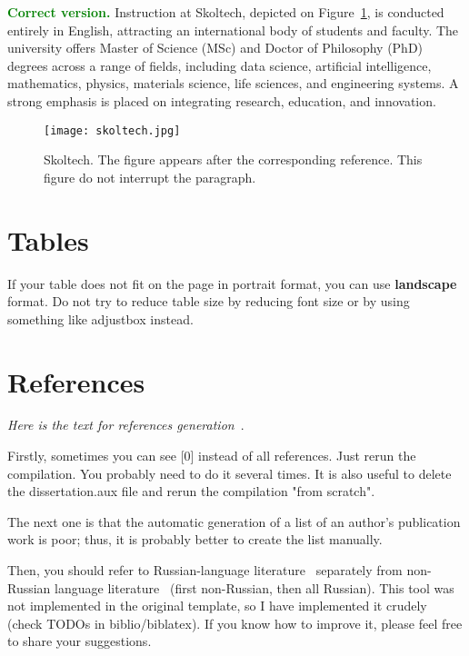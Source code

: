 \textcolor{green}{\textbf{Correct version.}}
Instruction at Skoltech, depicted on Figure~\ref{fig:example}, is conducted entirely in English, attracting an international body of students and faculty. The university offers Master of Science (MSc) and Doctor of Philosophy (PhD) degrees across a range of fields, including data science, artificial intelligence, mathematics, physics, materials science, life sciences, and engineering systems. A strong emphasis is placed on integrating research, education, and innovation. 

\begin{figure}[!h]
	\centering
	\texttt{[image: skoltech.jpg]}
	\caption{Skoltech. The figure appears after the corresponding reference. This figure do not interrupt the paragraph.}
	\label{fig:example}
\end{figure}

\section{Tables}

If your table does not fit on the page in portrait format, you can use \textbf{landscape} format. Do not try to reduce table size by reducing font size or by using something like adjustbox instead. 

\section{References}
\textit{Here is the text for references generation~\cite{lorden1971procedures, zhang2024self, ширяев1965некоторые}}.

Firstly, sometimes you can see [0] instead of all references. Just rerun the compilation. You probably need to do it several times. It is also useful to delete the dissertation.aux file and rerun the compilation "from scratch". 

The next one is that the automatic generation of a list of an author's publication work is poor; thus, it is probably better to create the list manually. 

Then, you should refer to Russian-language literature~\cite{ширяев1965некоторые} separately from non-Russian language literature~\cite{lorden1971procedures, zhang2024self} (first non-Russian, then all Russian). This tool was not implemented in the original template, so I have implemented it crudely (check TODOs in biblio/biblatex). If you know how to improve it, please feel free to share your suggestions.  

